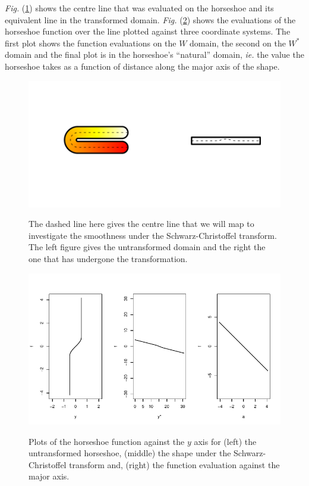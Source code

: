 \documentclass[a4paper,10pt]{amsart}
\newcommand{\sch}{Schwarz-Christoffel }
\newcommand{\Fig}[1]{\emph{Fig.} (\ref{#1})}
\begin{document}
\Fig{horseshoecentreline} shows the centre line that was evaluated on the horseshoe and its equivalent line in the transformed domain. \Fig{centrelinelineplot} shows the evaluations of the horseshoe function over the line plotted against three coordinate systems. The first plot shows the function evaluations on the $W$ domain, the second on the $W^*$ domain and the final plot is in the horseshoe's ``natural'' domain, \emph{ie.} the value the horseshoe takes as a function of distance along the major axis of the shape.

\begin{figure}
\centering
\includegraphics[trim=0.5in 1in 0in 1in]{figs/horseshoecentreline.pdf} \\
\caption{The dashed line here gives the centre line that we will map to investigate the smoothness under the \sch transform. The left figure gives the untransformed domain and the right the one that has undergone the transformation.}
\label{horseshoecentreline}
\end{figure}


\begin{figure}
\centering
\includegraphics[trim=0in 0in 0in 0in]{figs/centrelinelineplots.pdf} \\
\caption{Plots of the horseshoe function against the $y$ axis for (left) the untransformed horseshoe, (middle) the shape under the \sch transform and, (right) the function evaluation against the major axis.}
\label{centrelinelineplot}
\end{figure}
\end{document}
